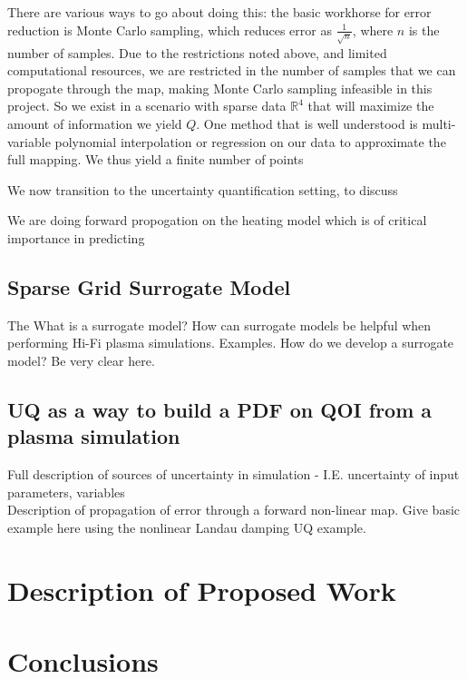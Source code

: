 \documentclass{article}
\begin{document}
There are various ways to go about doing this: the basic workhorse for error reduction is Monte Carlo sampling, which reduces error as $\frac{1}{\sqrt{n}}$, where $n$ is the number of samples. Due to the restrictions noted above, and limited computational resources, we are restricted in the number of samples that we can propogate through the map, making Monte Carlo sampling infeasible in this project. So we exist in a scenario with sparse data $\mathbb{R}^4$ that will maximize the amount of information we yield $Q$.  One method that is well understood is multi-variable polynomial interpolation or regression on our data to approximate the full mapping. We thus yield a finite number of points


We now transition to the uncertainty quantification setting, to discuss



We are doing forward propogation on the heating model which is of critical importance  in predicting





\subsection{Sparse Grid Surrogate Model}
The 
What is a surrogate model? How can surrogate models be helpful when performing  Hi-Fi plasma simulations. Examples. 
How do we develop a surrogate model? Be very clear here.


\subsection{UQ as a way to build a PDF on QOI from a plasma simulation}
Full description of sources of uncertainty in simulation - I.E. uncertainty of input parameters, variables\\
Description of propagation of error through a forward non-linear map. Give basic example here using the nonlinear Landau damping UQ example.\\

\section{Description of Proposed Work}

\section{Conclusions}
\end{document}

